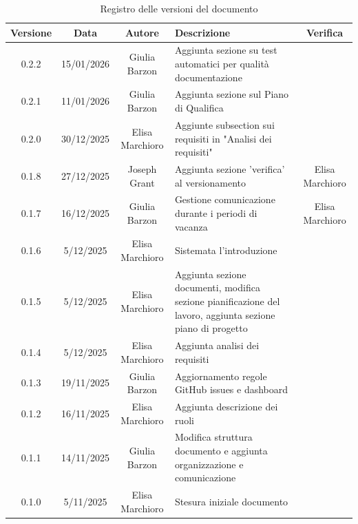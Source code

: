 \documentclass[11pt,a4paper]{article}
\begin{document}
\begin{table}[H]
    \centering
    \begin{tabular}{|c|c|c|>{\raggedright\arraybackslash}p{}|c|}
        \hline
        \textbf{Versione} & \textbf{Data} & \textbf{Autore} & \textbf{Descrizione} & \textbf{Verifica} \\
        \hline
        0.2.2 & 15/01/2026 & Giulia Barzon & Aggiunta sezione su test automatici per qualità documentazione & \\
        \hline
        0.2.1 & 11/01/2026 & Giulia Barzon & Aggiunta sezione sul Piano di Qualifica & \\
        \hline
        0.2.0 & 30/12/2025 & Elisa Marchioro & Aggiunte subsection sui requisiti in "Analisi dei requisiti" & \\ 
        \hline
        0.1.8 & 27/12/2025 & Joseph Grant & Aggiunta sezione 'verifica' al versionamento & Elisa Marchioro\\ 
        \hline
        0.1.7 & 16/12/2025 & Giulia Barzon & Gestione comunicazione durante i periodi di vacanza & Elisa Marchioro\\
        \hline
        0.1.6 & 5/12/2025 & Elisa Marchioro & Sistemata l'introduzione & \\
        \hline
        0.1.5 & 5/12/2025 & Elisa Marchioro & Aggiunta sezione documenti, modifica sezione pianificazione del lavoro, aggiunta sezione piano di progetto & \\
        \hline
        0.1.4 & 5/12/2025 & Elisa Marchioro & Aggiunta analisi dei requisiti & \\
        \hline
        0.1.3 & 19/11/2025 & Giulia Barzon & Aggiornamento regole GitHub issues e dashboard & \\
        \hline
        0.1.2 & 16/11/2025 & Elisa Marchioro & Aggiunta descrizione dei ruoli & \\
        \hline
        0.1.1 & 14/11/2025 & Giulia Barzon & Modifica struttura documento e aggiunta organizzazione e comunicazione & \\
        \hline
        0.1.0 & 5/11/2025 & Elisa Marchioro & Stesura iniziale documento & \\
        \hline
    \end{tabular}
    \caption{Registro delle versioni del documento}
    \label{tab:versionamento}
\end{table}

\newpage

\tableofcontents
\newpage
\end{document}
